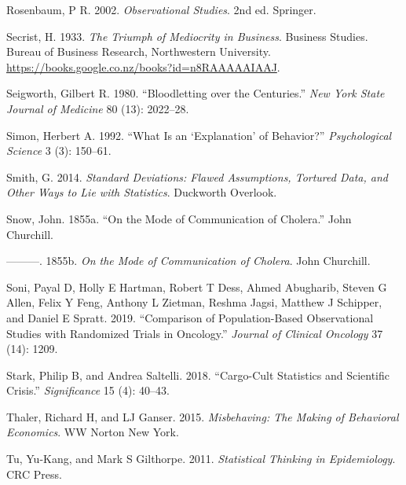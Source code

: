 \documentclass[
  10pt,
  b5paper]{book}
\newlength{\cslhangindent}
\newlength{\cslentryspacingunit} %
\newenvironment{CSLReferences}[2] %
 {%
  \setlength{\parindent}{0pt}
  \ifodd #1
  \let\oldpar\par
  \def\par{\hangindent=\cslhangindent\oldpar}
  \fi
  \setlength{\parskip}{#2\cslentryspacingunit}
 }%
 {}
\begin{document}
\begin{CSLReferences}{1}{0}
\leavevmode{}%
Rosenbaum, P R. 2002. \emph{Observational Studies}. 2nd ed. Springer.

\leavevmode{}%
Secrist, H. 1933. \emph{The Triumph of Mediocrity in Business}. Business Studies. Bureau of Business Research, Northwestern University. \url{https://books.google.co.nz/books?id=n8RAAAAAIAAJ}.

\leavevmode{}%
Seigworth, Gilbert R. 1980. {``Bloodletting over the Centuries.''} \emph{New York State Journal of Medicine} 80 (13): 2022--28.

\leavevmode{}%
Simon, Herbert A. 1992. {``What Is an {`Explanation'} of Behavior?''} \emph{Psychological Science} 3 (3): 150--61.

\leavevmode{}%
Smith, G. 2014. \emph{Standard Deviations: Flawed Assumptions, Tortured Data, and Other Ways to Lie with Statistics}. Duckworth Overlook.

\leavevmode{}%
Snow, John. 1855a. {``On the Mode of Communication of Cholera.''} John Churchill.

\leavevmode{}%
---------. 1855b. \emph{On the Mode of Communication of Cholera}. John Churchill.

\leavevmode{}%
Soni, Payal D, Holly E Hartman, Robert T Dess, Ahmed Abugharib, Steven G Allen, Felix Y Feng, Anthony L Zietman, Reshma Jagsi, Matthew J Schipper, and Daniel E Spratt. 2019. {``Comparison of Population-Based Observational Studies with Randomized Trials in Oncology.''} \emph{Journal of Clinical Oncology} 37 (14): 1209.

\leavevmode{}%
Stark, Philip B, and Andrea Saltelli. 2018. {``Cargo-Cult Statistics and Scientific Crisis.''} \emph{Significance} 15 (4): 40--43.

\leavevmode{}%
Thaler, Richard H, and LJ Ganser. 2015. \emph{Misbehaving: The Making of Behavioral Economics}. WW Norton New York.

\leavevmode{}%
Tu, Yu-Kang, and Mark S Gilthorpe. 2011. \emph{Statistical Thinking in Epidemiology}. CRC Press.


\end{CSLReferences}
\end{document}
